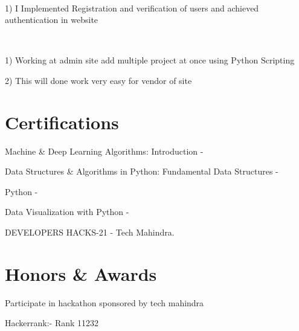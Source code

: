\documentclass[]{deedy-resume-openfont}
\begin{document}
        
            \hfill {}\\
            \begin{tightemize}
\item[] 1) I Implemented Registration and verification of users and achieved authentication in website
\end{tightemize}
            \sectionsep
          
        
            \hfill {}\\
            \begin{tightemize}
\item[] 1) Working at admin site add multiple project at once using Python Scripting
\item[] 2) This will done work very easy for vendor of site
\end{tightemize}
            \sectionsep
%
%
\section{Certifications}
\vspace{4pt}
\begin{tightemize}
\item Machine \& Deep Learning Algorithms: Introduction - \\
\item Data Structures \& Algorithms in Python: Fundamental Data Structures - \\
\item Python - \\
\item Data Visualization with Python - \\
\item DEVELOPERS HACKS-21 - Tech Mahindra.\\
\end{tightemize}
\vspace{4pt}
%
%
\section{Honors \& Awards}
\vspace{4pt}
\begin{tightemize}
\item Participate in hackathon sponsored by tech mahindra\\
\item Hackerrank:- Rank 11232\\
\end{tightemize}
      \ 
      
\end{document}
